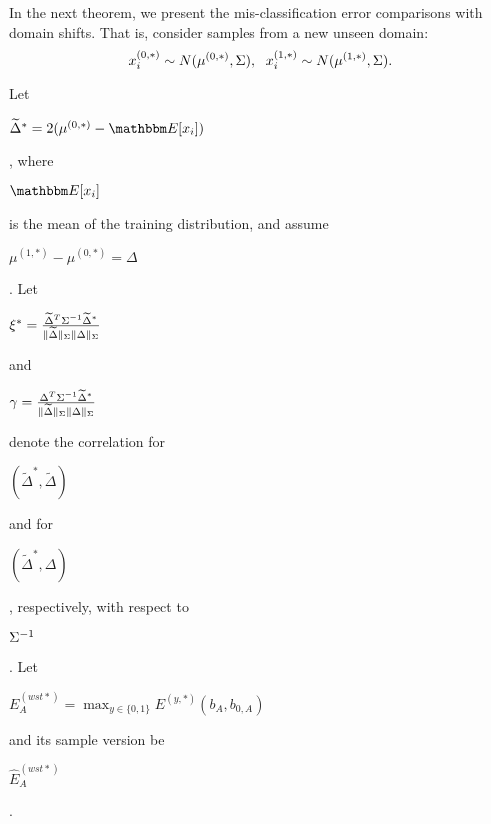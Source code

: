 In the next theorem, we present the mis-classification error comparisons with domain shifts. That is, consider samples from a new unseen domain: 
\begin{equation}
\small
    x_i^{(0,*)}\sim N(\mu^{(0,*)},\Sigma),~~x_i^{(1,*)}\sim N(\mu^{(1,*)},\Sigma).
\end{equation}
  
Let \begin{small}$\widetilde{\Delta}^*=2(\mu^{(0,*)}-\E[x_i])$\end{small}, where \begin{small}$\E[x_i]$\end{small} is the mean of the training distribution, and assume \begin{small}$\mu^{(1,*)}-\mu^{(0,*)}=\Delta$\end{small}. Let \begin{small}$\xi^*=\frac{\widetilde{\Delta}^T\Sigma^{-1}\widetilde{\Delta}^*}{\|\widetilde{\Delta}\|_{\Sigma}\|\Delta\|_{\Sigma}}$\end{small} and \begin{small}$\gamma=\frac{\Delta^T\Sigma^{-1}\widetilde{\Delta}^*}{\|\widetilde{\Delta}\|_{\Sigma}\|\Delta\|_{\Sigma}}$\end{small} denote the correlation for \begin{small}$(\widetilde{\Delta}^*,\widetilde{\Delta})$\end{small} and for \begin{small}$(\widetilde{\Delta}^*,\Delta)$\end{small}, respectively, with respect to \begin{small}$\Sigma^{-1}$\end{small}. 
Let \begin{small}$E^{(wst*)}_A= \max_{y\in\{0,1\}}E^{(y,*)}(b_A,b_{0,A})$\end{small} and its sample version be \begin{small}$\hat E^{(wst*)}_A$\end{small}.

